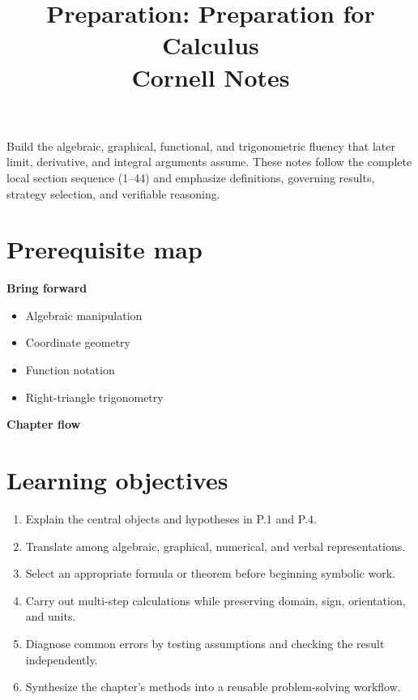 \documentclass[11pt]{article}
\title{Preparation: Preparation for Calculus\\[2mm]\large Cornell Notes}
\author{}
\date{}
\begin{document}
\maketitle
\thispagestyle{fancy}
\begin{orientationbox}
Build the algebraic, graphical, functional, and trigonometric fluency that later limit, derivative, and integral arguments assume. These notes follow the complete local section sequence (1--44) and emphasize definitions, governing results, strategy selection, and verifiable reasoning.
\end{orientationbox}

\section{Prerequisite map}
\begin{minipage}[t]{0.42\textwidth}
\textbf{Bring forward}
\begin{itemize}
\item Algebraic manipulation
\item Coordinate geometry
\item Function notation
\item Right-triangle trigonometry
\end{itemize}
\end{minipage}\hfill
\begin{minipage}[t]{0.54\textwidth}
\textbf{Chapter flow}
\begin{center}
\end{center}
\end{minipage}

\section{Learning objectives}
\begin{enumerate}
\item Explain the central objects and hypotheses in P.1 and P.4.
\item Translate among algebraic, graphical, numerical, and verbal representations.
\item Select an appropriate formula or theorem before beginning symbolic work.
\item Carry out multi-step calculations while preserving domain, sign, orientation, and units.
\item Diagnose common errors by testing assumptions and checking the result independently.
\item Synthesize the chapter's methods into a reusable problem-solving workflow.
\end{enumerate}
\end{document}

